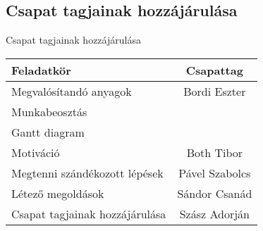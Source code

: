 \subsection{Csapat tagjainak hozzájárulása}

\begin{frame}{Csapat tagjainak hozzájárulása}

\begin{table}
\begin{tabular}{l | c }
Feladatkör & Csapattag\\
\hline \hline
Megvalósítandó anyagok & {\color{blue}Bordi Eszter}\\
Munkabeosztás & \\
Gantt diagram & \\
Motiváció & {\color{blue}Both Tibor}\\ 
Megtenni szándékozott lépések & {\color{blue}Pável Szabolcs}\\
Létező megoldások & {\color{blue}Sándor Csanád}\\
Csapat tagjainak hozzájárulása & {\color{blue}Szász Adorján}
\end{tabular}
\end{table}

\end{frame}